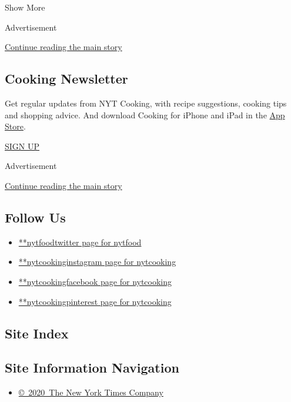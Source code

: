 Show More

Advertisement

\protect\hyperlink{after-mid2}{Continue reading the main story}

\hypertarget{cooking-newsletter}{%
\subsection{Cooking Newsletter}\label{cooking-newsletter}}

Get regular updates from NYT Cooking, with recipe suggestions, cooking
tips and shopping advice. And download Cooking for iPhone and iPad in
the
\href{https://itunes.apple.com/us/app/nyt-cooking-recipes-from-new/id911422904?mt=8}{App
Store}.

\href{/newsletters/signup/CK}{SIGN UP}

Advertisement

\protect\hyperlink{after-mktg}{Continue reading the main story}

\hypertarget{follow-us}{%
\subsection{Follow Us}\label{follow-us}}

\begin{itemize}
\tightlist
\item
  \href{https://twitter.com/nytfood}{**nytfoodtwitter page for nytfood}
\item
  \href{https://instagram.com/nytcooking}{**nytcookinginstagram page for
  nytcooking}
\item
  \href{https://www.facebook.com/nytcooking}{**nytcookingfacebook page
  for nytcooking}
\item
  \href{https://pinterest.com/nytcooking}{**nytcookingpinterest page for
  nytcooking}
\end{itemize}

\hypertarget{site-index}{%
\subsection{Site Index}\label{site-index}}

\hypertarget{site-information-navigation}{%
\subsection{Site Information
Navigation}\label{site-information-navigation}}

\begin{itemize}
\tightlist
\item
  \href{https://help.nytimes.com/hc/en-us/articles/115014792127-Copyright-notice}{©~2020~The
  New York Times Company}
\end{itemize}


